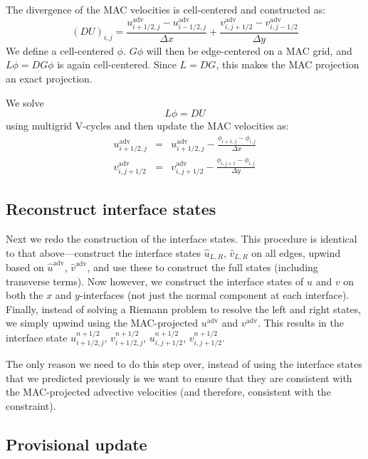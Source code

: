 The divergence of the MAC velocities is cell-centered and constructed as:
\begin{equation}
(D U)_{i,j} = \frac{u^\mathrm{adv}_{i+1/2,j} - u^\mathrm{adv}_{i-1/2,j}}
                   {\Delta x} +
              \frac{v^\mathrm{adv}_{i,j+1/2} - v^\mathrm{adv}_{i,j-1/2}}
                   {\Delta y}
\end{equation}
We define a cell-centered $\phi$.  $G\phi$ will then be edge-centered
on a MAC grid, and $L\phi = DG\phi$ is again cell-centered.  Since $L =
DG$, this makes the MAC projection an exact projection.

We solve
\begin{equation}
L\phi = DU
\end{equation}
using multigrid V-cycles and then update the MAC velocities as:
\begin{eqnarray}
u^\mathrm{adv}_{i+1/2,j} &=& u^\mathrm{adv}_{i+1/2,j} - 
    \frac{\phi_{i+1,j} - \phi_{i,j}}{\Delta x} \\
%
v^\mathrm{adv}_{i,j+1/2} &=& v^\mathrm{adv}_{i,j+1/2} - 
    \frac{\phi_{i,j+1} - \phi_{i,j}}{\Delta y}
\end{eqnarray}


\subsection{Reconstruct interface states}

Next we redo the construction of the interface states.  This procedure
is identical to that above---construct the interface states
$\hat{u}_{L,R}$, $\hat{v}_{L,R}$ on all edges, upwind based on
$\hat{u}^\mathrm{adv}$, $\hat{v}^\mathrm{adv}$, and use these to
construct the full states (including transverse terms).  Now however,
we construct the interface states of $u$ and $v$ on both the $x$ and
$y$-interfaces (not just the normal component at each interface).
Finally, instead of solving a Riemann problem to resolve the left and
right states, we simply upwind using the MAC-projected
$u^\mathrm{adv}$ and $v^\mathrm{adv}$.  This results in the interface
state $u^{n+1/2}_{i+1/2,j}$, $v^{n+1/2}_{i+1/2,j}$, $u^{n+1/2}_{i,j+1/2}$,
$v^{n+1/2}_{i,j+1/2}$.

The only reason we need to do this step over, instead of using the
interface states that we predicted previously is we want to ensure
that they are consistent with the MAC-projected advective velocities
(and therefore, consistent with the constraint).

\subsection{Provisional update}

